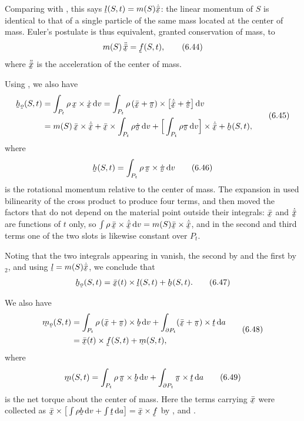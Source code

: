 Comparing with , this says $\vek{l}(S,t)=m(S)\dot{\bar{\bx}}$:
the linear momentum of $S$ is identical to that of a single particle of
the same mass located at the center of mass. Euler's postulate
 is thus equivalent, granted conservation of mass, to
\begin{equation}
   m(S)\,\ddot{\bar{\bx}}=\vek{f}(S,t),
   \tag{6.44}\label{eq:6.44}
\end{equation}
where $\ddot{\bar{\bx}}$ is the acceleration of the center of mass.

Using , we also have
\begin{equation}
\begin{aligned}
   \bh_{\bo}(S,t)
   &=\int_{P_{t}}\rho\,\bx\times\dot\bx\,\dl v
    =\int_{P_{t}}\rho\,(\bar{\bx}+\vek\pi)\times
      \big[\dot{\bar{\bx}}+\dot{\vek\pi}\big]\,\dl v\\
   &=m(S)\,\bar{\bx}\times\dot{\bar{\bx}}
    +\bar{\bx}\times\int_{P_{t}}\rho\dot{\vek\pi}\,\dl v
    +\Big[\int_{P_{t}}\rho\vek\pi\,\dl v\Big]\times\dot{\bar{\bx}}
    +\bh(S,t),
\end{aligned}
   \tag{6.45}\label{eq:6.45}
\end{equation}
where
\begin{equation}
   \bh(S,t)=\int_{P_{t}}\rho\,\vek\pi\times\dot{\vek\pi}\,\dl v
   \tag{6.46}\label{eq:6.46}
\end{equation}
is the rotational momentum relative to the center of mass. The
expansion in  used bilinearity of the cross product to
produce four terms, and then moved the factors that do not depend on
the material point outside their integrals: $\bar{\bx}$ and
$\dot{\bar{\bx}}$ are functions of $t$ only, so
$\int\rho\,\bar{\bx}\times\dot{\bar{\bx}}\,\dl v
=m(S)\bar{\bx}\times\dot{\bar{\bx}}$, and in the second and third terms
one of the two slots is likewise constant over $P_{t}$.

Noting that the two integrals appearing in  vanish, the
second by  and the first by $_{2}$, and using
$\vek{l}=m(S)\dot{\bar{\bx}}$, we conclude that
\begin{equation}
   \bh_{\bo}(S,t)=\bar{\bx}(t)\times\vek{l}(S,t)+\bh(S,t).
   \tag{6.47}\label{eq:6.47}
\end{equation}

We also have
\begin{equation}
\begin{aligned}
   \bm_{\bo}(S,t)
   &=\int_{P_{t}}\rho\,(\bar{\bx}+\vek\pi)\times\bb\,\dl v
    +\int_{\partial P_{t}}(\bar{\bx}+\vek\pi)\times\bt\,\dl a\\
   &=\bar{\bx}(t)\times\vek{f}(S,t)+\bm(S,t),
\end{aligned}
   \tag{6.48}\label{eq:6.48}
\end{equation}
where
\begin{equation}
   \bm(S,t)=\int_{P_{t}}\rho\,\vek\pi\times\bb\,\dl v
   +\int_{\partial P_{t}}\vek\pi\times\bt\,\dl a
   \tag{6.49}\label{eq:6.49}
\end{equation}
is the net torque about the center of mass. Here the terms carrying
$\bar{\bx}$ were collected as
$\bar{\bx}\times\big[\int\rho\bb\,\dl v+\int\bt\,\dl a\big]
=\bar{\bx}\times\vek{f}$ by ,  and .

